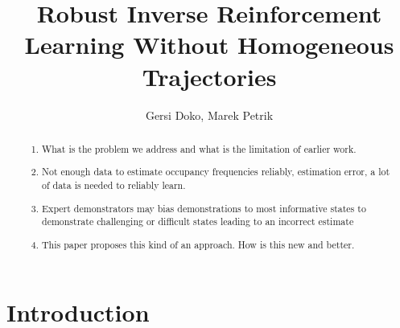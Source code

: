 \documentclass[11pt]{article}
\title{Robust Inverse Reinforcement Learning Without Homogeneous Trajectories}
\author{Gersi Doko, Marek Petrik}
\begin{document}
\maketitle

\begin{abstract}
	\begin{enumerate}
		\item What is the problem we address and what is the limitation of earlier work.
		\item Not enough data to estimate occupancy frequencies reliably, estimation
		      error, a lot of data is needed to reliably learn.
		\item Expert demonstrators may bias demonstrations to most informative states to
		      demonstrate challenging or difficult states leading to an incorrect estimate
		\item This paper proposes this kind of an approach. How is this new and better.
	\end{enumerate}
\end{abstract}


\section{Introduction}
\end{document}
